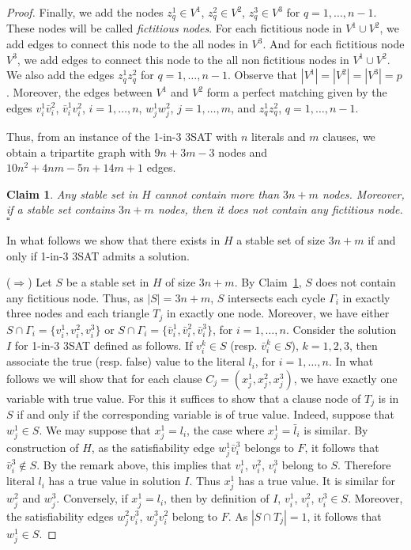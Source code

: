 \documentclass{article}
\theoremstyle{plain}
\newtheorem{claim}[theorem]{Claim}
\theoremstyle{definition}
\begin{document}
\begin{proof}
Finally, we add the nodes $z^1_q\in V^1$, $z^2_q\in V^2$, $z^3_q\in V^3$ for $q=1,\dots,n-1$. These nodes will be called {\em fictitious nodes}. For each fictitious node in $V^1\cup V^2$, we add edges to connect this node to the all nodes in $V^3$. And for each fictitious node $V^3$, we add edges to connect this node to the all non fictitious nodes in $V^1\cup V^2$. We also add the edges $z^1_qz^2_q$ for $q=1,\dots,n-1$. Observe that $|V^1|=|V^2|=|V^3|=p$. Moreover, the edges between $V^1$ and $V^2$ form a perfect matching given by the edges $v^1_i\bar{v}^2_i$, $\bar{v}^1_iv^2_i$, $i=1,\dots,n$, $w^1_jw^2_j$, $j=1,\dots,m$, and $z^1_qz^2_q$, $q=1,\dots,n-1$.

Thus, from an instance of the 1-in-3 3SAT with $n$ literals and $m$ clauses, we obtain a tripartite graph with $9n+3m-3$ nodes and $10n^2+4nm-5n+14m+1$ edges.

\begin{claim}
\label{claim_4}
Any stable set in $H$ cannot contain more than $3n+m$ nodes. Moreover, if a stable set contains $3n+m$ nodes, then it does not contain any fictitious node.\hfill$\square$
\end{claim}

In what follows we show that there exists in $H$ a stable set of size $3n+m$ if and only if 1-in-3 3SAT admits a solution.

\noindent($\Rightarrow$) Let $S$ be a stable set in $H$ of size $3n+m$. By Claim~\ref{claim_4}, $S$ does not contain any fictitious node. Thus, as $|S|=3n+m$, $S$ intersects each cycle $\Gamma_i$ in exactly three nodes and each triangle $T_j$ in exactly one node. Moreover, we have either $S\cap\Gamma_i=\{v^1_i,v^2_i,v^3_i\}$ or $S\cap \Gamma_i=\{\bar{v}^1_i,\bar{v}^2_i,\bar{v}^3_i\}$, for $i=1,\dots,n$. Consider the solution $I$ for 1-in-3 3SAT defined as follows. If $v^k_i\in S$ (resp. $\bar{v}^k_i\in S$), $k=1,2,3$, then associate the true (resp. false) value to the literal $l_i$, for $i=1,\dots,n$. In what follows we will show that for each clause $C_j=(x^1_j,x^2_j,x^3_j)$, we have exactly one variable with true value. For this it suffices to show that a clause node of $T_j$ is in $S$ if and only if the corresponding variable is of true value. Indeed, suppose that $w^1_j\in S$. We may suppose that $x^1_j=l_i$, the case where $x^1_j=\bar{l}_i$ is similar. By construction of $H$, as the satisfiability edge $w^1_j\bar{v}^3_i$ belongs to $F$, it follows that $\bar{v}^3_i\notin S$. By the remark above, this implies that $v^1_i$, $v^2_i$, $v^3_i$ belong to $S$. Therefore literal $l_i$ has a true value in solution $I$. Thus $x^1_j$ has a true value. It is similar for $w^2_j$ and $w^3_j$. Conversely, if $x^1_j=l_i$, then by definition of $I$, $v^1_i$, $v^2_i$, $v^3_i\in S$. Moreover, the satisfiability edges $w^2_jv^3_i$, $w^3_jv^2_i$ belong to $F$. As $|S\cap T_j|=1$, it follows that $w^1_j\in S$.


\end{proof}
\end{document}
